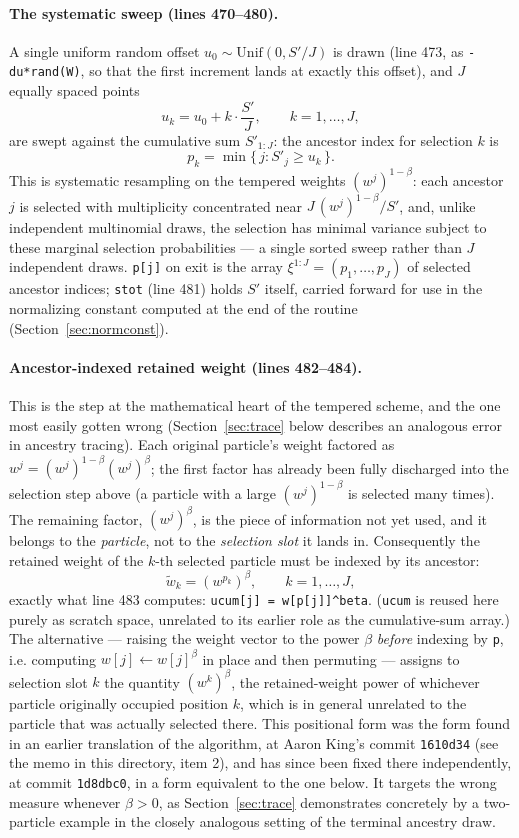 \documentclass[11pt]{article}
\begin{document}
\paragraph{The systematic sweep (lines 470--480).} A single uniform random
offset $u_0 \sim \mathrm{Unif}(0,S'/J)$ is drawn (line 473, as
\texttt{-du*rand(W)}, so that the first increment lands at exactly this
offset), and $J$ equally spaced points
\[
u_k = u_0 + k\cdot \frac{S'}{J}, \qquad k=1,\dots,J,
\]
are swept against the cumulative sum $S'_{1:J}$: the ancestor index for
selection $k$ is
\[
p_k = \min\{\, j : S'_j \ge u_k \,\}.
\]
This is systematic resampling on the tempered weights $(w^j)^{1-\beta}$: each
ancestor $j$ is selected with multiplicity concentrated near
$J\,(w^j)^{1-\beta}/S'$, and, unlike independent multinomial draws, the
selection has minimal variance subject to these marginal selection
probabilities — a single sorted sweep rather than $J$ independent draws.
\texttt{p[j]} on exit is the array $\xi^{1:J} = (p_1,\dots,p_J)$ of selected
ancestor indices; \texttt{stot} (line 481) holds $S'$ itself, carried
forward for use in the normalizing constant computed at the end of the
routine (Section~\ref{sec:normconst}).

\paragraph{Ancestor-indexed retained weight (lines 482--484).} This is the
step at the mathematical heart of the tempered scheme, and the one most easily
gotten wrong (Section~\ref{sec:trace} below describes an analogous error in
ancestry tracing). Each original particle's weight factored as
$w^j = (w^j)^{1-\beta}(w^j)^{\beta}$; the first factor has already been fully
discharged into the selection step above (a particle with a large
$(w^j)^{1-\beta}$ is selected many times). The remaining factor, $(w^j)^\beta$,
is the piece of information not yet used, and it belongs to the \emph{particle},
not to the \emph{selection slot} it lands in. Consequently the retained weight
of the $k$-th selected particle must be indexed by its ancestor:
\[
\tilde{w}_k = (w^{p_k})^{\beta}, \qquad k=1,\dots,J,
\]
exactly what line 483 computes:
\texttt{ucum[j] = w[p[j]]\textasciicircum{}beta}. (\texttt{ucum} is reused here
purely as scratch space, unrelated to its earlier role as the cumulative-sum
array.) The alternative — raising the weight vector to the power $\beta$
\emph{before} indexing by \texttt{p}, i.e. computing
$w[j] \leftarrow w[j]^\beta$ in place and then permuting — assigns to
selection slot $k$ the quantity $(w^k)^\beta$, the retained-weight power of
whichever particle originally occupied position $k$, which is in general
unrelated to the particle that was actually selected there. This positional
form was the form found in an earlier translation of the algorithm, at Aaron
King's commit \texttt{1610d34} (see the memo in this directory, item 2), and
has since been fixed there independently, at commit \texttt{1d8dbc0}, in a
form equivalent to the one below. It targets the wrong measure whenever
$\beta>0$, as Section~\ref{sec:trace} demonstrates concretely by a
two-particle example in the closely analogous setting of the terminal
ancestry draw.
\end{document}
